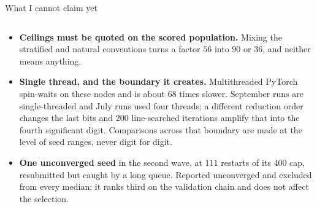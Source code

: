 \documentclass[aspectratio=169,10pt]{beamer}
\newcommand{\hl}[1]{{\color{accent}\textbf{#1}}}
\begin{document}
\begin{frame}[shrink=25]{What I cannot claim yet}
\begin{columns}[T]
\begin{column}{0.48\textwidth}
\begin{itemize}
              $150$ to $400$; the cleaner fix, giving the confirmation pass its
              own budget, is not yet applied. No result changes, because a
              larger cap cannot affect a run that stopped on the stall criterion
              below it.
        \item \hl{Ceilings must be quoted on the scored population.} Mixing the
              stratified and natural conventions turns a factor $56$ into $90$
              or $36$, and neither means anything.
        \item \hl{Single thread, and the boundary it creates.} Multithreaded
              PyTorch spin-waits on these nodes and is about $68$ times slower.
              September runs are single-threaded and July runs used four
              threads; a different reduction order changes the last bits and
              $200$ line-searched iterations amplify that into the fourth
              significant digit. Comparisons across that boundary are made at
              the level of seed ranges, never digit for digit.
        \item \hl{One unconverged seed} in the second wave, at $111$ restarts of
              its $400$ cap, resubmitted but caught by a long queue. Reported
              unconverged and excluded from every median; it ranks third on the
              validation chain and does not affect the selection.
      \end{itemize}
    \end{column}
  \end{columns}
\end{frame}
\end{document}
